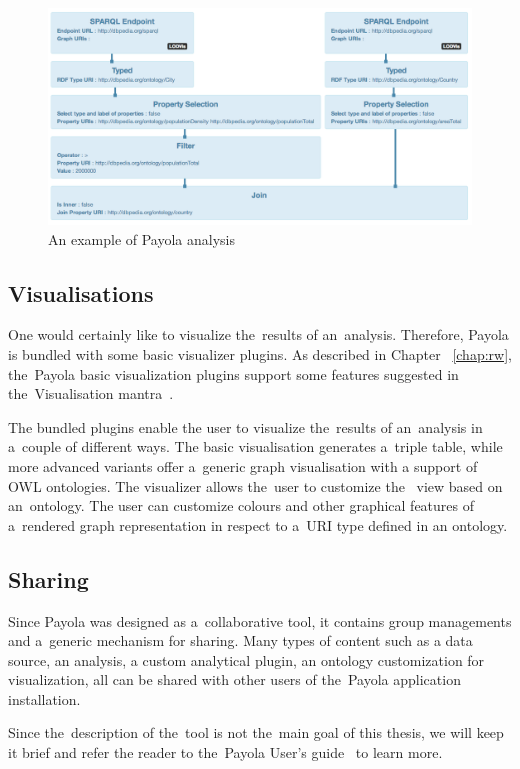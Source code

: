 \begin{figure}
	\centering
	\includegraphics[width=150mm]{images/example-analysis.png}
	\caption{An example of Payola analysis}
	\label{fig:example-analysis}
\end{figure}

\subsection{Visualisations}
One would certainly like to visualize the~results of an~analysis. Therefore, 
Payola is bundled with some basic visualizer plugins. As described
in Chapter ~\ref{chap:rw}, the~Payola basic visualization 
plugins support some features suggested in the~Visualisation 
mantra~\cite{mantra}.

The bundled plugins enable the user to visualize the~results of an~analysis 
in a~couple of different ways. The basic visualisation generates a~triple 
table, while more advanced variants offer a~generic graph visualisation with a 
support of OWL ontologies. The visualizer allows the~user to customize the~
view based on an~ontology. The user can customize colours and other graphical 
features of a~rendered graph representation in respect to a~URI type defined in 
an ontology.

\subsection{Sharing}
Since Payola was designed as a~collaborative tool, it contains group 
managements and a~generic mechanism for sharing. Many types of content such as a 
data source, an analysis, a custom analytical plugin, an ontology customization for 
visualization, all can be shared with other users of the~Payola application 
installation.

Since the~description of the~tool is not the~main goal of this thesis, we will 
keep it brief and refer the reader to the~Payola User's guide~\cite{payola:ug} to learn more.

